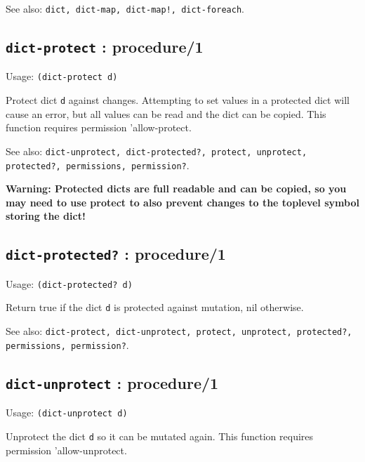 \documentclass[
]{article}
\newcommand{\passthrough}[1]{#1}
\begin{document}
See also:
\passthrough{\lstinline"dict, dict-map, dict-map!, dict-foreach"}.

\hypertarget{dict-protect-procedure1-1}{%
\subsection{\texorpdfstring{\texttt{dict-protect} :
procedure/1}{dict-protect : procedure/1}}\label{dict-protect-procedure1-1}}

Usage: \passthrough{\lstinline!(dict-protect d)!}

Protect dict \passthrough{\lstinline!d!} against changes. Attempting to
set values in a protected dict will cause an error, but all values can
be read and the dict can be copied. This function requires permission
'allow-protect.

See also:
\passthrough{\lstinline!dict-unprotect, dict-protected?, protect, unprotect, protected?, permissions, permission?!}.

\textbf{Warning: Protected dicts are full readable and can be copied, so
you may need to use protect to also prevent changes to the toplevel
symbol storing the dict!}

\hypertarget{dict-protected-procedure1-1}{%
\subsection{\texorpdfstring{\texttt{dict-protected?} :
procedure/1}{dict-protected? : procedure/1}}\label{dict-protected-procedure1-1}}

Usage: \passthrough{\lstinline!(dict-protected? d)!}

Return true if the dict \passthrough{\lstinline!d!} is protected against
mutation, nil otherwise.

See also:
\passthrough{\lstinline!dict-protect, dict-unprotect, protect, unprotect, protected?, permissions, permission?!}.

\hypertarget{dict-unprotect-procedure1-1}{%
\subsection{\texorpdfstring{\texttt{dict-unprotect} :
procedure/1}{dict-unprotect : procedure/1}}\label{dict-unprotect-procedure1-1}}

Usage: \passthrough{\lstinline!(dict-unprotect d)!}

Unprotect the dict \passthrough{\lstinline!d!} so it can be mutated
again. This function requires permission 'allow-unprotect.
\end{document}
